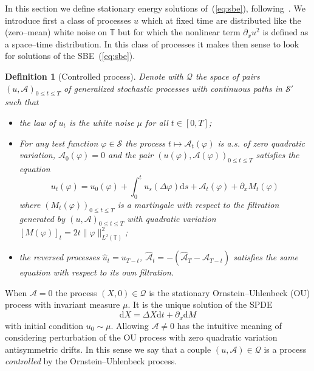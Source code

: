 \documentclass[a4paper,11pt]{article}
\newcommand{\mathd}{\mathrm{d}}
\newcommand{\tmem}[1]{{\em #1\/}}
\newtheorem{definition}{Definition}
\newcommand{\cS}{\mathscr{S}}
\begin{document}
In this section we define stationary energy solutions of~(\ref{eq:sbe}),
following~{\cite{gubinelli_regularization_2013}}. We introduce first a class
of processes $u$ which at fixed time are distributed like the (zero--mean)
white noise on $\mathbb{T}$ but for which the nonlinear term $\partial_x u^2$
is defined as a space--time distribution. In this class of processes it makes
then sense to look for solutions of the SBE~(\ref{eq:sbe}).

\begin{definition}
  [Controlled process]\label{def:controlled}Denote with $\mathcal{Q}$ the
  space of pairs $(u, \mathcal{A})_{0 \leqslant t \leqslant T}$ of generalized
  stochastic processes with continuous paths in $\cS'$ such that
  \begin{itemize}
    \item[i)] the law of $u_t$ is the white noise $\mu$ for all $t \in [0,
    T]$;
    
    \item[ii)] For any test function $\varphi \in \cS$ the process $t \mapsto
    \mathcal{A}_t (\varphi)$ is a.s. of zero quadratic variation,
    $\mathcal{A}_0 (\varphi) = 0$ and the pair $(u (\varphi), \mathcal{A}
    (\varphi))_{0 \leqslant t \leqslant T} $ satisfies the equation
    \begin{equation}
      \label{eq:controlled-decomposition} u_t (\varphi) = u_0 (\varphi) +
      \int_0^t u_s (\Delta \varphi) \mathd s +\mathcal{A}_t (\varphi) +
      \partial_x M_t (\varphi)
    \end{equation}
    where $(M_t (\varphi))_{0 \leqslant t \leqslant T}$ is a martingale with
    respect to the filtration generated by $(u, \mathcal{A})_{0 \leqslant t
    \leqslant T}$ with quadratic variation $[M (\varphi)]_t = 2 t \| \varphi
    \|_{L^2 (\mathbb{T})}^2$;
    
    \item[iii)] the reversed processes $\hat{u}_t = u_{T - t}$,
    $\hat{\mathcal{A}}_t = - (\hat{\mathcal{A}}_T -\mathcal{A}_{T - t})$
    satisfies the same equation with respect to its own filtration.
  \end{itemize}
\end{definition}

When $\mathcal{A}= 0$ the process $(X, 0) \in \mathcal{Q}$ is the stationary
Ornstein--Uhlenbeck (OU) process with invariant measure $\mu$. It is the
unique solution of the SPDE
\[ \mathd X = \Delta X \mathd t + \partial_x \mathd M \]
with initial condition $u_0 \sim \mu$. Allowing $\mathcal{A} \neq 0$ has the
intuitive meaning of considering perturbation of the OU process with zero
quadratic variation antisymmetric drifts. In this sense we say that a couple
$(u, \mathcal{A}) \in \mathcal{Q}$ is a process {\tmem{controlled}} by the
Ornstein--Uhlenbeck process.
\end{document}
